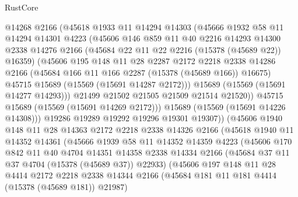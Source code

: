 \begin{lexlean}{RustCore}
\begin{coremodule}
              @14268
              @2166
              (@45618
                @1933
                @11
                @14294
                @14303
                (@45666
                  @1932
                  @58
                  @11
                  @14294
                  @14301
                  @4223
                  (@45606
                    @146
                    @859
                    @11
                    @40
                    @2216
                    @14293
                    @14300
                    @2338
                    @14276
                    @2166
                    (@45684 @22 @11 @22 @2216 (@15378 (@45689 @22)) @16359)
                    (@45606
                      @195
                      @148
                      @11
                      @28
                      @2287
                      @2172
                      @2218
                      @2338
                      @14286
                      @2166
                      (@45684 @166 @11 @166 @2287 (@15378 (@45689 @166)) @16675)
                      @45715
                      @15689
                      (@15569 (@15691 @14287 @2172)))
                    @15689
                    (@15569 (@15691 @14277 @14293)))
                  @21499
                  @21502
                  @21505
                  @21509
                  @21514
                  @21520))
              @45715
              @15689
              (@15569 (@15691 @14269 @2172)))
            @15689
            (@15569 (@15691 @14226 @14308)))
          @19286
          @19289
          @19292
          @19296
          @19301
          @19307))
      (@45606
        @1940
        @148
        @11
        @28
        @14363
        @2172
        @2218
        @2338
        @14326
        @2166
        (@45618
          @1940
          @11
          @14352
          @14361
          (@45666
            @1939
            @58
            @11
            @14352
            @14359
            @4223
            (@45606
              @170
              @842
              @11
              @40
              @4704
              @14351
              @14358
              @2338
              @14334
              @2166
              (@45684 @37 @11 @37 @4704 (@15378 (@45689 @37)) @22933)
              (@45606
                @197
                @148
                @11
                @28
                @4414
                @2172
                @2218
                @2338
                @14344
                @2166
                (@45684 @181 @11 @181 @4414 (@15378 (@45689 @181)) @21987)

\end{coremodule}
\end{lexlean}
